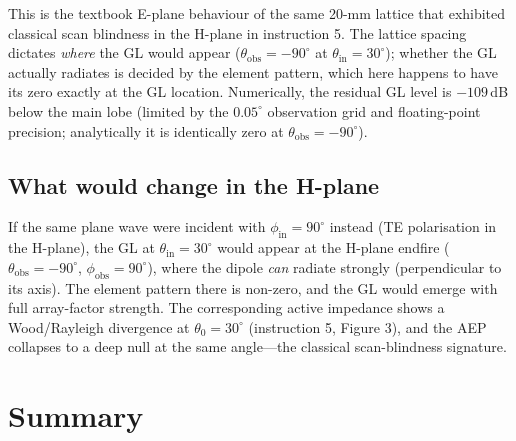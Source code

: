 \documentclass{article}
\begin{document}
This is the textbook E-plane behaviour of the same 20-mm lattice that exhibited classical scan blindness in the H-plane in instruction 5. The lattice spacing dictates \emph{where} the GL would appear ($\theta_{\text{obs}} = -90^\circ$ at $\theta_{\text{in}} = 30^\circ$); whether the GL actually radiates is decided by the element pattern, which here happens to have its zero exactly at the GL location. Numerically, the residual GL level is $-109\,$dB below the main lobe (limited by the $0.05^\circ$ observation grid and floating-point precision; analytically it is identically zero at $\theta_{\text{obs}} = -90^\circ$).

\subsection{What would change in the H-plane}

If the same plane wave were incident with $\phi_{\text{in}} = 90^\circ$ instead (TE polarisation in the H-plane), the GL at $\theta_{\text{in}} = 30^\circ$ would appear at the H-plane endfire ($\theta_{\text{obs}} = -90^\circ$, $\phi_{\text{obs}} = 90^\circ$), where the dipole \emph{can} radiate strongly (perpendicular to its axis). The element pattern there is non-zero, and the GL would emerge with full array-factor strength. The corresponding active impedance shows a Wood/Rayleigh divergence at $\theta_0 = 30^\circ$ (instruction 5, Figure 3), and the AEP collapses to a deep null at the same angle---the classical scan-blindness signature.

\section{Summary}
\end{document}
